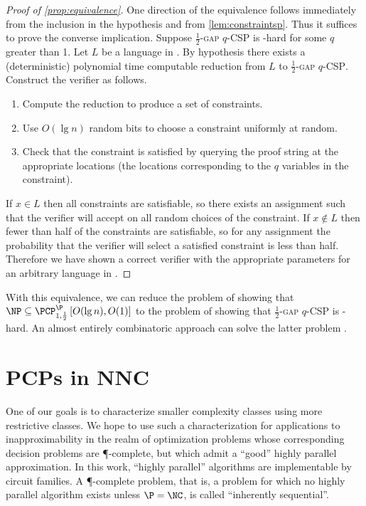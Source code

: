 \documentclass[]{article}
\newcommand{\PCPcs}[5]{\PCP^{#1}_{#2, #3}\left[#4, #5\right]}
\begin{document}
\begin{proof}[Proof of \autoref{prop:equivalence}]
  One direction of the equivalence follows immediately from the inclusion in the hypothesis and from \autoref{lem:constraintsp}.
  Thus it suffices to prove the converse implication.
  Suppose \textsc{$\frac{1}{2}$-gap $q$-CSP} is \NP-hard for some $q$ greater than 1.
  Let $L$ be a language in \NP.
  By hypothesis there exists a (deterministic) polynomial time computable reduction from $L$ to \textsc{$\frac{1}{2}$-gap $q$-CSP}.
  Construct the \PCP{} verifier as follows.
  \begin{enumerate}
  \item Compute the reduction to produce a set of constraints.
  \item Use $O(\lg n)$ random bits to choose a constraint uniformly at random.
  \item Check that the constraint is satisfied by querying the proof string at the appropriate locations (the locations corresponding to the $q$ variables in the constraint).
  \end{enumerate}

  If $x \in L$ then all constraints are satisfiable, so there exists an assignment such that the verifier will accept on all random choices of the constraint.
  If $x \notin L$ then fewer than half of the constraints are satisfiable, so for any assignment the probability that the verifier will select a satisfied constraint is less than half.
  Therefore we have shown a correct \PCP{} verifier with the appropriate parameters for an arbitrary language in \NP.
\end{proof}
With this equivalence, we can reduce the problem of showing that $\NP \subseteq \PCPcs{\P}{1}{\frac{1}{2}}{O(\lg n)}{O(1)}$ to the problem of showing that \textsc{$\frac{1}{2}$-gap $q$-CSP} is \NP-hard.
An almost entirely combinatoric approach can solve the latter problem \cite{dinur07}.

\section{PCPs in NNC}

One of our goals is to characterize smaller complexity classes using more restrictive \PCP{} classes.
We hope to use such a characterization for applications to inapproximability in the realm of optimization problems whose corresponding decision problems are \P-complete, but which admit a ``good'' highly parallel approximation.
In this work, ``highly parallel'' algorithms are implementable by \NC{} circuit families.
A \P-complete problem, that is, a problem for which no highly parallel algorithm exists unless $\P = \NC$, is called ``inherently sequential''.
\end{document}
